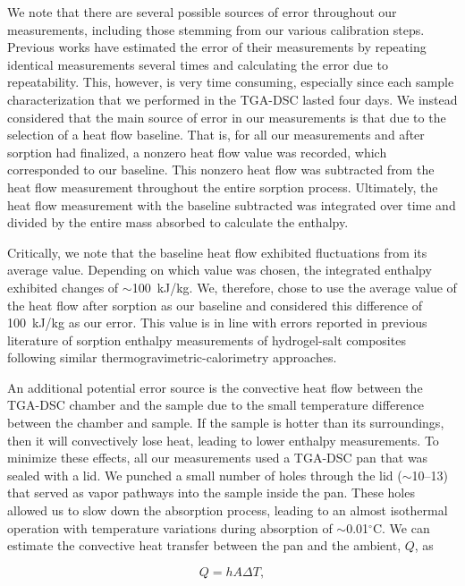 \documentclass[11pt]{article}
\begin{document}
We note that there are several possible sources of error throughout our measurements, including those stemming from our various calibration steps. Previous works have estimated the error of their measurements by repeating identical measurements several times and calculating the error due to repeatability.\cite{kim2016} This, however, is very time consuming, especially since each sample characterization that we performed in the TGA-DSC lasted four days. We instead considered that the main source of error in our measurements is that due to the selection of a heat flow baseline. That is, for all our measurements and after sorption had finalized, a nonzero heat flow value was recorded, which corresponded to our baseline. This nonzero heat flow was subtracted from the heat flow measurement throughout the entire sorption process. Ultimately, the heat flow measurement with the baseline subtracted was integrated over time and divided by the entire mass absorbed to calculate the enthalpy.

Critically, we note that the baseline heat flow exhibited fluctuations from its average value. Depending on which value was chosen, the integrated enthalpy exhibited changes of $\sim$100~kJ/kg. We, therefore, chose to use the average value of the heat flow after sorption as our baseline and considered this difference of 100~kJ/kg as our error. This value is in line with errors reported in previous literature of sorption enthalpy measurements of hydrogel-salt composites following similar thermogravimetric-calorimetry approaches.\cite{lu2022}

An additional potential error source is the convective heat flow between the TGA-DSC chamber and the sample due to the small temperature difference between the chamber and sample. If the sample is hotter than its surroundings, then it will convectively lose heat, leading to lower enthalpy measurements. To minimize these effects, all our measurements used a TGA-DSC pan that was sealed with a lid. We punched a small number of holes through the lid ($\sim$10--13) that served as vapor pathways into the sample inside the pan. These holes allowed us to slow down the absorption process, leading to an almost isothermal operation with temperature variations during absorption of $\sim$0.01$^\circ$C. We can estimate the convective heat transfer between the pan and the ambient, $Q$, as

\begin{equation}
Q = hA\Delta T, \tag{S43}
\end{equation}
\end{document}
